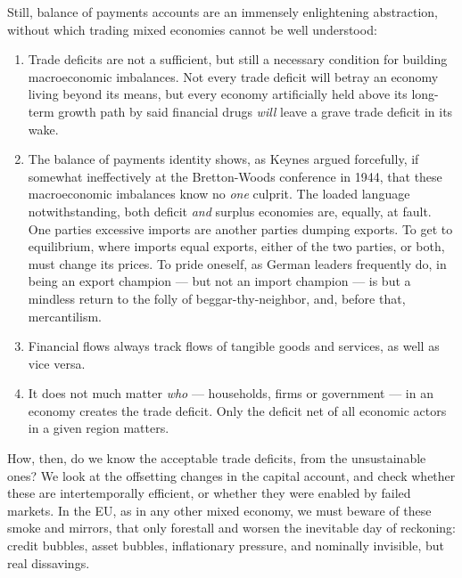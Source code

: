 \documentclass[11pt,a4paper,oneside,openright]{article}
\begin{document}
Still, balance of payments accounts are an immensely enlightening abstraction, without which trading mixed economies cannot be well understood:
\begin{enumerate}
	\item Trade deficits are not a sufficient, but still a necessary condition for building macroeconomic imbalances. 
	Not every trade deficit will betray an economy living beyond its means, but every economy artificially held above its long-term growth path by said financial drugs \emph{will} leave a grave trade deficit in its wake.
	\item The balance of payments identity shows, as Keynes  argued forcefully, if somewhat ineffectively at the Bretton-Woods conference in 1944, that these macroeconomic imbalances know no \emph{one} culprit. 
	The loaded language notwithstanding, both deficit \emph{and} surplus economies are, equally, at fault. 
	One parties excessive imports are another parties dumping exports. 
	To get to equilibrium, where imports equal exports, either of the two parties, or both, must change its prices. 
	To pride oneself, as German leaders frequently do, in being an export champion --- but not an import champion --- is but a mindless return to the folly of beggar-thy-neighbor, and, before that, mercantilism.
	\item Financial flows always track flows of tangible goods and services, as well as vice versa.
	\item It does not much matter \emph{who} --- households, firms or government --- in an economy creates the trade deficit. 
	Only the deficit net of all economic actors in a given region matters. 
\end{enumerate}

How, then, do we know the acceptable trade deficits, from the unsustainable ones? 
We look at the offsetting changes in the capital account, and check whether these are intertemporally efficient, or whether they were enabled by failed markets. 
In the \gls{EU}, as in any other mixed economy, we must beware of these smoke and mirrors, that only forestall and worsen the inevitable day of reckoning: 
credit bubbles, asset bubbles, inflationary pressure, and nominally invisible, but real dissavings.  %
\end{document}
